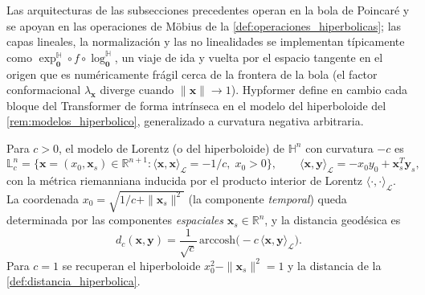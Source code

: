 Las arquitecturas de las subsecciones precedentes operan en la bola de Poincaré y se apoyan en las operaciones de Möbius de la \autoref{def:operaciones_hiperbolicas}; las capas lineales, la normalización y las no linealidades se implementan típicamente como $\exp_{\mathbf{0}}^{\mathbb{H}} \circ f \circ \log_{\mathbf{0}}^{\mathbb{H}}$, un viaje de ida y vuelta por el espacio tangente en el origen que es numéricamente frágil cerca de la frontera de la bola (el factor conformacional $\lambda_{\mathbf{x}}$ diverge cuando $\|\mathbf{x}\| \to 1$). Hypformer \citep{yang2024hypformer} define en cambio cada bloque del \gls{Transformer} de forma intrínseca en el modelo del hiperboloide del \autoref{rem:modelos_hiperbolico}, generalizado a curvatura negativa arbitraria.

\begin{definition}\label{def:modelo_lorentz}
Para $c > 0$, el modelo de Lorentz (o del hiperboloide) de $\mathbb{H}^n$ con curvatura $-c$ es
\begin{equation}
    \mathbb{L}^n_c = \{\mathbf{x} = (x_0, \mathbf{x}_s) \in \mathbb{R}^{n+1} : \langle \mathbf{x}, \mathbf{x} \rangle_{\mathcal{L}} = -1/c, \; x_0 > 0\},
    \qquad
    \langle \mathbf{x}, \mathbf{y} \rangle_{\mathcal{L}} = -x_0 y_0 + \mathbf{x}_s^T \mathbf{y}_s,
    \label{eq:modelo_lorentz}
\end{equation}
con la métrica riemanniana inducida por el producto interior de Lorentz $\langle \cdot, \cdot \rangle_{\mathcal{L}}$. La coordenada $x_0 = \sqrt{1/c + \|\mathbf{x}_s\|^2}$ (la componente \emph{temporal}) queda determinada por las componentes \emph{espaciales} $\mathbf{x}_s \in \mathbb{R}^n$, y la distancia geodésica es
\begin{equation}
    d_c(\mathbf{x}, \mathbf{y}) = \frac{1}{\sqrt{c}}\,\text{arccosh}\big(-c\,\langle \mathbf{x}, \mathbf{y} \rangle_{\mathcal{L}}\big).
    \label{eq:distancia_lorentz_curvatura}
\end{equation}
Para $c = 1$ se recuperan el hiperboloide $x_0^2 - \|\mathbf{x}_s\|^2 = 1$ y la distancia de la \autoref{def:distancia_hiperbolica}.
\end{definition}

